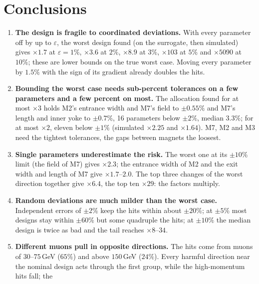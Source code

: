 \documentclass[11pt,a4paper]{article}
\begin{document}
\clearpage
\section{Conclusions}

\begin{enumerate}
  \item \textbf{The design is fragile to coordinated deviations.} With every parameter off by up
        to $\varepsilon$, the worst design found (on the surrogate, then simulated) gives
        $\times1.7$ at $\varepsilon=1\%$, $\times3.6$ at $2\%$, $\times8.9$ at $3\%$, $\times103$ at
        $5\%$ and $\times5090$ at $10\%$; these are lower bounds on the true worst case. Moving every
        parameter by $1.5\%$ with the sign of its gradient already doubles the hits.
  \item \textbf{Bounding the worst case needs sub-percent tolerances on a few parameters and a
        few percent on most.} The allocation found for at most $\times3$ holds M2's entrance width
        and M7's field to $\pm0.55\%$ and M7's length and inner yoke to $\pm0.7\%$, 16 parameters
        below $\pm2\%$, median $3.3\%$; for at most $\times2$, eleven below $\pm1\%$ (simulated
        $\times2.25$ and $\times1.64$). M7, M2 and M3 need the tightest tolerances, the gaps between
        magnets the loosest.
  \item \textbf{Single parameters underestimate the risk.} The worst one at its $\pm10\%$ limit
        (the field of M7) gives $\times2.3$; the entrance width of M2 and the exit width and length
        of M7 give $\times1.7$--$2.0$. The top three changes of the worst direction together give
        $\times6.4$, the top ten $\times29$: the factors multiply.
  \item \textbf{Random deviations are much milder than the worst case.} Independent errors of
        $\pm2\%$ keep the hits within about $\pm20\%$; at $\pm5\%$ most designs stay within
        $\pm60\%$ but some quadruple the hits; at $\pm10\%$ the median design is twice as bad and
        the tail reaches $\times8$--$34$.
  \item \textbf{Different muons pull in opposite directions.} The hits come from muons of
        $30$--$75$\,GeV ($65\%$) and above $150$\,GeV ($24\%$). Every harmful direction near the
        nominal design acts through the first group, while the high-momentum hits fall; the

\end{enumerate}
\end{document}
